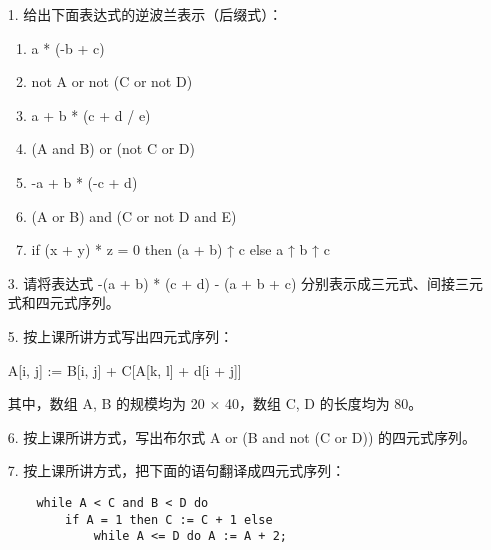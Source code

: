 \begin{enumerate}
    \item[1.] 给出下面表达式的逆波兰表示（后缀式）：
    
    \begin{enumerate}
        \item a * (-b + c)
        \item not A or not (C or not D)
        \item a + b * (c + d / e)
        \item (A and B) or (not C or D)
        \item -a + b * (-c + d)
        \item (A or B) and (C or not D and E)
        \item if (x + y) * z = 0 then (a + b) ↑ c else a ↑ b ↑ c
    \end{enumerate}
    
    \item[3.] 请将表达式 -(a + b) * (c + d) - (a + b + c) 分别表示成三元式、间接三元式和四元式序列。
    
    \item[5.] 按上课所讲方式写出四元式序列：
    
    \begin{center}
        A[i, j] := B[i, j] + C[A[k, l] + d[i + j]]
    \end{center}
    
    其中，数组 A, B 的规模均为 20 × 40，数组 C, D 的长度均为 80。
    
    \item[6.] 按上课所讲方式，写出布尔式 A or (B and not (C or D)) 的四元式序列。
    
    \item[7.] 按上课所讲方式，把下面的语句翻译成四元式序列：
    
    \begin{lstlisting}
    while A < C and B < D do
        if A = 1 then C := C + 1 else
            while A <= D do A := A + 2;
    \end{lstlisting}
\end{enumerate}